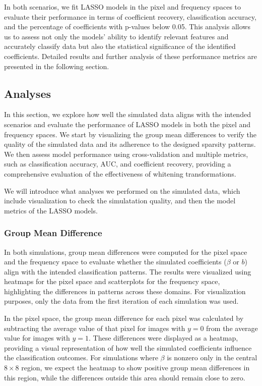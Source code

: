 \documentclass[12pt]{article}
\begin{document}
In both scenarios, we fit LASSO models in the pixel and frequency spaces to evaluate their performance in terms of coefficient recovery, classification accuracy, and the percentage of coefficients with p-values below 0.05. This analysis allows us to assess not only the models' ability to identify relevant features and accurately classify data but also the statistical significance of the identified coefficients. Detailed results and further analysis of these performance metrics are presented in the following section.


\subsection{Analyses}

In this section, we explore how well the simulated data aligns with the intended scenarios and evaluate the performance of LASSO models in both the pixel and frequency spaces. We start by visualizing the group mean differences to verify the quality of the simulated data and its adherence to the designed sparsity patterns. We then assess model performance using cross-validation and multiple metrics, such as classification accuracy, AUC, and coefficient recovery, providing a comprehensive evaluation of the effectiveness of whitening transformations.


We will introduce what analyses we performed on the simulated data, which include visualization to check the simulatation quality, and then the model metrics of the LASSO models.

\subsubsection{Group Mean Difference}

In both simulations, group mean differences were computed for the pixel space and the frequency space to evaluate whether the simulated coefficients (\( \beta \) or \( b \)) align with the intended classification patterns. The results were visualized using heatmaps for the pixel space and scatterplots for the frequency space, highlighting the differences in patterns across these domains. For visualization purposes, only the data from the first iteration of each simulation was used.

In the pixel space, the group mean difference for each pixel was calculated by subtracting the average value of that pixel for images with \( y = 0 \) from the average value for images with \( y = 1 \). These differences were displayed as a heatmap, providing a visual representation of how well the simulated coefficients influence the classification outcomes. For simulations where \( \beta \) is nonzero only in the central \( 8 \times 8 \) region, we expect the heatmap to show positive group mean differences in this region, while the differences outside this area should remain close to zero.
\end{document}
